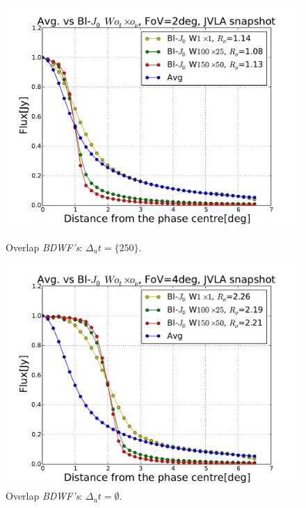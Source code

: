 \documentclass[useAMS,usenatbib]{mn2e}
\begin{document}
\begin{figure}
\begin{minipage}{0.45\linewidth}\includegraphics[width=1\textwidth]{./Figures/Bl-bessel-FoV2-vla.pdf}\caption{Overlap 
		\textit{BDWF's}: $\Delta_u t=\{250\}$.}\label{fig:Bl-bessel-FoV2}\end{minipage}
\begin{minipage}{0.45\linewidth}\includegraphics[width=1\textwidth]{./Figures/Bl-bessel-FoV4-vla.pdf}\caption{
Overlap 
		\textit{BDWF's}: $\Delta_u t=\emptyset$.}\label{fig:Bl-bessel-FoV4}\end{minipage}
\end{figure}
\end{document}
